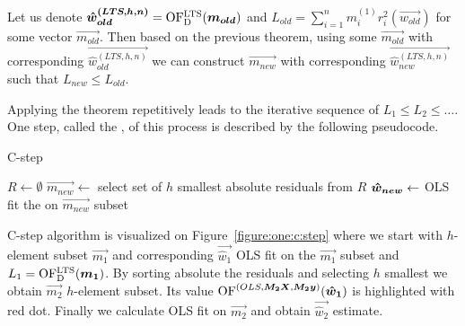 Let us denote $\boldsymbol{\hat{w}_{old}^{(LTS, h, n)}} = \operatorname{OF^{LTS}_D}(\boldsymbol{m_{old}})$ and 
$L_{old} = \sum\limits_{i=1}^n m^{(1)}_i r_{i}^2(\vec{w_{old}})$ for some vector $\vec{m_{old}}$. Then based on the previous theorem, using some $\vec{m_{old}}$ with corresponding $\vec{\hat{w}_{old}^{(LTS, h, n)}}$ we can construct $\vec{m_{new}}$ with corresponding $\vec{\hat{w}_{new}^{(LTS, h, n)}}$ such that $L_{new} \leq L_{old}$. 

Applying the theorem repetitively leads to the iterative sequence of
$L_{1} \leq L_{2} \leq \ldots$. One step, called the , of this process is described by the following pseudocode.

\begin{algorithm}[H]
    \label{alg:Cstep}
    \caption{C-step}
    $R \gets \emptyset$\;
    $\vec{m_{new}} \gets $ select set of $h$ smallest absolute residuals from $R$\;
    $\boldsymbol{\hat{w}_{new}} \gets$ OLS fit the on $\vec{m_{new}}$ subset\;
    \;
\end{algorithm}

C-step algorithm is visualized on Figure~\ref{figure:one:c:step} where we start with $h$-element subset $\vec{m_1}$ and corresponding $\vec{\hat{w}_1}$ OLS fit on the $\vec{m_1}$ subset and $L_1 = \operatorname{OF^{LTS}_D}(\boldsymbol{m_1})$. By sorting absolute the residuals and selecting $h$ smallest we obtain $\vec{m_2}$ $h$-element subset. Its value $\operatorname{OF}^{(OLS,\boldsymbol{M_2}\boldsymbol{X},  \boldsymbol{M_2}\boldsymbol{y})} (\boldsymbol{\hat{w}_1})$ is highlighted with red dot. Finally we calculate OLS fit on $\vec{m_2}$ and obtain $\vec{\hat{w}_2}$ estimate. 



